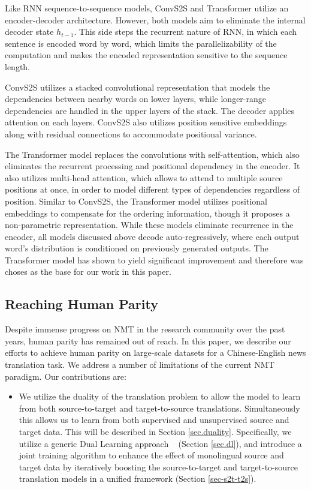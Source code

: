 \documentclass[a4paper]{article}
\begin{document}
\begin{CJK*}{UTF8}{gbsn}
Like RNN sequence-to-sequence models, ConvS2S and Transformer utilize an encoder-decoder architecture. However, both models aim to eliminate the internal decoder state $h_{t-1}$. This side steps the recurrent nature of RNN, in which each sentence is encoded word by word, which limits the parallelizability of the computation and makes the encoded representation  sensitive to the sequence length. 

ConvS2S utilizes a stacked convolutional representation that models the dependencies between nearby words on lower layers, while longer-range dependencies are handled in the upper layers of the stack. The decoder applies attention on each layers. ConvS2S also utilizes position sensitive embeddings along with residual connections to accommodate positional variance.

The Transformer model replaces the convolutions with self-attention, which also eliminates the recurrent processing and positional dependency in the encoder. It also utilizes multi-head attention, which allows to attend to multiple source positions at once, in order to model different types of dependencies regardless of position. Similar to ConvS2S, the Transformer model utilizes positional embeddings to compensate for the ordering information, though it proposes a non-parametric representation. While these models eliminate recurrence in the encoder, all models discussed above decode auto-regressively, where each output word's distribution is conditioned on previously generated outputs. The Transformer model has shown \cite{vaswani2017attention} to yield significant improvement and therefore was choses as the base for our work in this paper.


\subsection{Reaching Human Parity}

Despite immense progress on NMT in the research community over the past years, human parity has remained out of reach. In this paper, we describe our efforts to achieve human parity on large-scale datasets for a Chinese-English news translation task. We  address a number of limitations of the current NMT paradigm. Our contributions are:
\begin{itemize}
\item We utilize the duality of the translation problem to allow the model to learn from both source-to-target and target-to-source translations. Simultaneously this allows us to learn from both supervised and unsupervised source and target data. This will be described in Section \ref{sec.duality}. Specifically, we utilize a generic Dual Learning approach ~\cite{dualNMT,DSL,dualInfer}   (Section \ref{sec.dl}), and introduce a joint training algorithm to enhance the effect of monolingual source and target data by iteratively boosting the  source-to-target and target-to-source translation models in a unified framework (Section \ref{sec-s2t-t2s}).


\end{itemize}
\end{CJK*}
\end{document}
